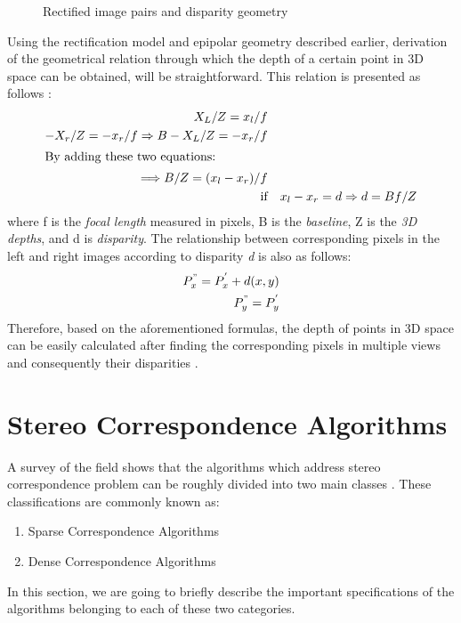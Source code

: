 \documentclass[12pt]{report}
\begin{document}
\begin{figure}[h!]
\centering

\caption{Rectified image pairs and disparity geometry}
\label{fig:rectify}
\end{figure} 


Using the rectification model and epipolar geometry described earlier, 
derivation of the geometrical relation through which the depth of a certain point in 3D space 
can be obtained, will be straightforward. This relation is presented as follows \cite{sze11}:
\begin{align}
X_{L}/Z=x_{l}/f \\
-X_{r}/Z=-x_{r}/f  \Rightarrow B-X_{L}/Z=-x_{r}/f \\
\intertext{By adding these two equations:} \Longrightarrow  B/Z=(x_{l}-x_{r})/f\\
\text{if} && x_{l}-x_{r}=d \Rightarrow d=Bf/Z
\end{align}
where f is the {\it focal length} measured in pixels, B is the {\it baseline}, Z is the {\it 3D depths}, and d is {\it disparity}. The relationship between corresponding pixels in the left
and right images according to disparity {\it d} is also as follows:
\begin{align}
{P}^{"}_{x}={P}^{'}_{x}+d(x,y) \\
{P}^{"}_{y} = {P}^{'}_{y}
\end{align}
Therefore, based on the aforementioned formulas, the depth of points in 3D space can be easily calculated after finding the corresponding pixels in multiple views and consequently their
disparities \cite{bol87,oku93,sch02}.

\section{Stereo Correspondence Algorithms}
A survey of the field shows that the algorithms which address stereo correspondence problem can be roughly divided into two main classes \cite{sch02}. These classifications are commonly known as:
\begin{enumerate}
\item Sparse Correspondence Algorithms
\item Dense Correspondence Algorithms 
\end{enumerate}

In this section, we are going to briefly describe the important specifications of the algorithms belonging to each of these two categories.
\end{document}

